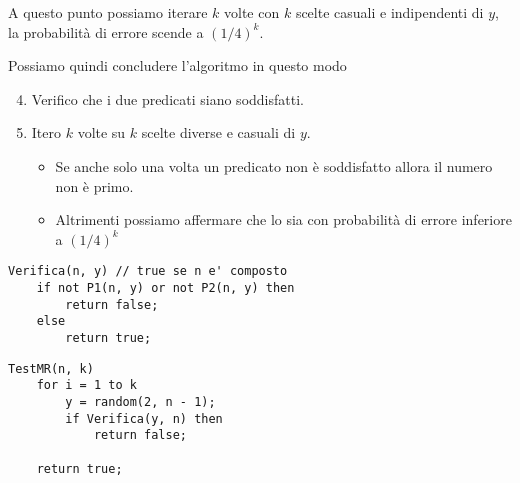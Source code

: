 A questo punto possiamo iterare $k$ volte con $k$ scelte casuali e indipendenti di $y$, la probabilit\`a di errore scende
a $(1/4)^k$.

Possiamo quindi concludere l'algoritmo in questo modo
\begin{enumerate}
	\setcounter{enumi}{3}
	\item Verifico che i due predicati siano soddisfatti.
	\item Itero $k$ volte su $k$ scelte diverse e casuali di $y$.
	      \begin{itemize}
		      \item Se anche solo una volta un predicato non \`e soddisfatto allora il numero non \`e primo.
		      \item Altrimenti possiamo affermare che lo sia con probabilit\`a di errore inferiore a $(1/4)^k$
	      \end{itemize}
\end{enumerate}

\begin{lstlisting}[style=pseudo-style]
Verifica(n, y) // true se n e' composto
	if not P1(n, y) or not P2(n, y) then
		return false;
	else
		return true;
\end{lstlisting}

\begin{lstlisting}[style=pseudo-style]
TestMR(n, k)
	for i = 1 to k
		y = random(2, n - 1);
		if Verifica(y, n) then 
			return false;

	return true;
\end{lstlisting}

